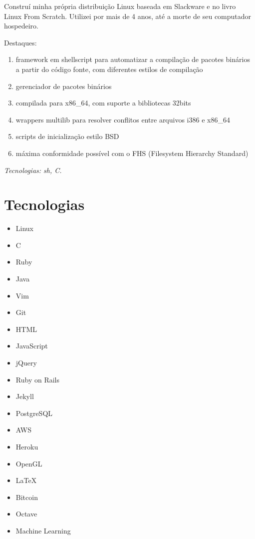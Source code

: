 \documentclass[a4paper]{simplecv}
\begin{document}
\begin{topic}
	Construí minha própria distribuição Linux baseada em Slackware e no
	livro Linux From Scratch. Utilizei por mais de 4 anos, até a morte de
	seu computador hospedeiro.

	Destaques:

	\begin{enumerate}
		\item framework em shellscript para automatizar a compilação de
			pacotes binários a partir do código fonte, com
			diferentes estilos de compilação

		\item gerenciador de pacotes binários

		\item compilada para x86\_64, com suporte a bibliotecas 32bits

		\item wrappers multilib para resolver conflitos entre arquivos
			i386 e x86\_64

		\item scripts de inicialização estilo BSD

		\item máxima conformidade possível com o FHS (Filesystem
			Hierarchy Standard)
	\end{enumerate}

	{\em\scriptsize Tecnologias: sh, C.}

\end{topic}

\section{Tecnologias}

\begin{multicols}{3}
	\raggedcolumns
	\begin{itemize}
		\item Linux
		\item C
		\item Ruby
		\item Java
		\item Vim
		\item Git
		\item HTML
		\item JavaScript
		\item jQuery
		\item Ruby on Rails
		\item Jekyll
		\item PostgreSQL
		\item AWS
		\item Heroku
		\item OpenGL
		\item \LaTeX{}
		\item Bitcoin
		\item Octave
		\item Machine Learning
	\end{itemize}
\end{multicols}
\end{document}
